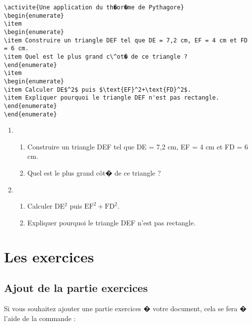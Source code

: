 \documentclass[ams,openany,10pt,presentation,latin1]{mathbook}
\begin{document}
\begin{lstlisting}
\activite{Une application du th�or�me de Pythagore}
\begin{enumerate}
\item
\begin{enumerate}
\item Construire un triangle DEF tel que DE = 7,2 cm, EF = 4 cm et FD = 6 cm.
\item Quel est le plus grand c\^ot� de ce triangle ?
\end{enumerate}
\item
\begin{enumerate}
\item Calculer DE$^2$ puis $\text{EF}^2+\text{FD}^2$.
\item Expliquer pourquoi le triangle DEF n'est pas rectangle.
\end{enumerate}
\end{enumerate}
\end{lstlisting}



\begin{enumerate}
\item
\begin{enumerate}
\item Construire un triangle DEF tel que DE = 7,2 cm, EF = 4 cm et FD = 6 cm.
\item Quel est le plus grand c\^ot� de ce triangle ?
\end{enumerate}
\item
\begin{enumerate}
\item Calculer DE$^2$ puis $\text{EF}^2+\text{FD}^2$.
\item Expliquer pourquoi le triangle DEF n'est pas rectangle.
\end{enumerate}
\end{enumerate}

\newpage

\section{Les exercices}

\subsection{Ajout de la partie \og exercices \fg}

Si vous souhaitez ajouter une partie \og exercices \fg{} � votre document, cela se fera � l'aide de la commande :
\end{document}
